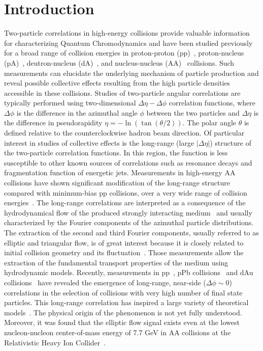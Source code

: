 \documentclass[aps,prl,twocolumn,showpacs,superscriptaddress,groupedaddress]{revtex4}  %
\begin{document}
\section{\label{sec:introduction}Introduction}
Two-particle correlations in high-energy collisions provide valuable information for characterizing Quantum Chromodynamics and have been studied previously for a broad range of collision energies in proton-proton (pp)~\cite{Khachatryan:2010gv}, proton-nucleus (pA)~\cite{CMS:2012qk,Abelev:2012ola,Aad:2012gla}, deutron-nucleus (dA)~\cite{}, and nucleus-nucleus (AA)~\cite{Aamodt:2010pa,Chatrchyan:2012wg} collisions. Such measurements can elucidate the underlying mechanism of particle production and reveal possible collective effects resulting from the high particle densities accessible in these collisions.
Studies of two-particle angular correlations are typically performed using two-dimensional $\Delta\eta-\Delta\phi$ correlation functions, where $\Delta\phi$ is the difference in the azimuthal angle $\phi$ between the two particles and $\Delta\eta$ is the difference in pseudorapidity $\eta = -\ln(\tan(\theta/2))$. The polar angle $\theta$ is defined relative to the counterclockwise hadron beam direction.
Of particular interest in studies of collective effects is the long-range (large $|\Delta\eta|$) structure of the two-particle correlation functions. In this region, the function is less susceptible to other known sources of correlations such as resonance decays and fragmentation function of energetic jets. Measurements in high-energy AA collisions have shown significant modification of the long-range structure compared with minimum-bias pp collisions, over a very wide range of collision energies~\cite{Back:2004je,Arsene:2004fa,Adcox:2004mh,Adams:2005dq}. The long-range correlations are interpreted as a consequence of the hydrodynamical flow of the produced strongly interacting medium~\cite{Ollitrault:1992bk} and usually characterized by the Fourier components of the azimuthal particle distributions. The extraction of the second and third Fourier components, usually referred to as elliptic and triangular flow, is of great interest because it is closely related to initial collision geometry and its fluctuation~\cite{Alver:2010gr}. Those measurements allow the extraction of the fundamental transport properties of the medium using hydrodynamic models.
Recently, measurements in pp~\cite{Khachatryan:2010gv}, pPb collisions~\cite{CMS:2012qk,Abelev:2012ola,Aad:2012gla} and dAu collisions~\cite{} have revealed the emergence of long-range, near-side ($\Delta\phi\sim 0$) correlations in the selection of collisions with very high number of final state particles. This long-range correlation has inspired a large variety of theoretical models~\cite{Bzdak:2013zma,Dusling:2015gta}. The physical origin of the phenomenon is not yet fully understood. Moreover, it was found that the elliptic flow signal exists even at the lowest nucleon-nucleon center-of-mass energy of 7.7 GeV in AA collisions at the Relativistic Heavy Ion Collider~\cite{Adamczyk:2012ku}. 
\end{document}
